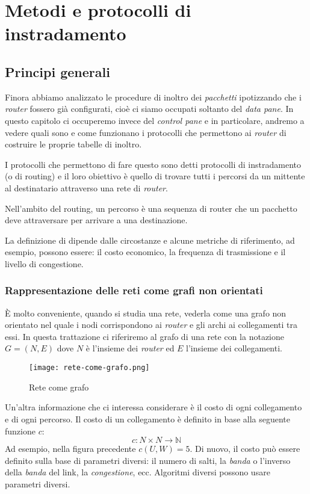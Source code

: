 \chapter{Metodi e protocolli di instradamento}
\section{Principi generali}
Finora abbiamo analizzato le procedure di inoltro dei \emph{pacchetti} ipotizzando
che i \emph{router} fossero già configurati, cioè ci siamo occupati soltanto del
\emph{data pane}. In questo capitolo ci occuperemo invece del \emph{control pane}
e in particolare, andremo a vedere quali sono e come funzionano i protocolli che
permettono ai \emph{router} di costruire le proprie tabelle di inoltro.

I protocolli che permettono di fare questo sono detti protocolli di instradamento
(o di routing) e il loro obiettivo è quello di trovare tutti i 
percorsi da un mittente al destinatario attraverso una rete di \emph{router}.

\begin{definition}[Percorso]
    Nell'ambito del routing, un percorso è una sequenza di router che un
    pacchetto deve attraversare per arrivare a una destinazione.
\end{definition}\noindent
La definizione di  dipende dalle circostanze e alcune metriche
di riferimento, ad esempio, possono essere: il costo economico, la frequenza di
trasmissione e il livello di congestione.

\subsection{Rappresentazione delle reti come grafi non orientati}
È molto conveniente, quando si studia una rete, vederla come una grafo non
orientato nel quale i nodi corrispondono ai \emph{router} e gli archi ai
collegamenti tra essi. In questa trattazione ci riferiremo al grafo di una rete
con la notazione $G=(N,E)$ dove $N$ è l'insieme dei \emph{router} ed $E$ l'insieme
dei collegamenti.

\begin{figure}[h!]
    \centering
    \texttt{[image: rete-come-grafo.png]}
    \caption{Rete come grafo}
\end{figure}\noindent
Un'altra informazione che ci interessa considerare è il costo di ogni collegamento
e di ogni percorso. Il costo di un collegamento è definito in base alla seguente
funzione $c$:
\[c:N\times N\to\mathbb{N}\]
Ad esempio, nella figura precedente $c(U,W)=5$. Di nuovo, il costo può essere
definito sulla base di parametri diversi: il numero di salti, la \emph{banda} o
l'inverso della \emph{banda} del link, la \emph{congestione}, ecc. Algoritmi
diversi possono usare parametri diversi.

